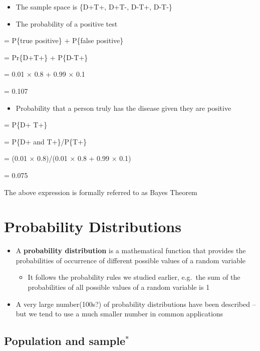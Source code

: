 \documentclass[
]{book}
\providecommand{\tightlist}{%
  \setlength{\itemsep}{0pt}\setlength{\parskip}{0pt}}
\begin{document}
\begin{itemize}
\tightlist
\item
  The sample space is \{D+T+, D+T-, D-T+, D-T-\}
\item
  The probability of a positive test
\end{itemize}

= P\{true positive\} + P\{false positive\}

= Pr\{D+T+\} + P\{D-T+\}

= 0.01 × 0.8 + 0.99 × 0.1

= 0.107

\begin{itemize}
\tightlist
\item
  Probability that a person truly has the disease given they are positive
\end{itemize}

= P\{D+ \textbar{} T+\}

= P\{D+ and T+\}/P\{T+\}

= (0.01 × 0.8)/(0.01 × 0.8 + 0.99 × 0.1)

= 0.075

The above expression is formally referred to as Bayes Theorem

\hypertarget{probability-distributions}{%
\section{Probability Distributions}\label{probability-distributions}}

\begin{itemize}
\tightlist
\item
  A \textbf{probability distribution} is a mathematical function that provides the probabilities of occurrence of different possible values of a random variable

  \begin{itemize}
  \tightlist
  \item
    It follows the probability rules we studied earlier, e.g.~the sum of the probabilities of all possible values of a random variable is 1
  \end{itemize}
\item
  A very large number(100s?) of probability distributions have been described -- but we tend to use a much smaller number in common applications
\end{itemize}

\hypertarget{population-and-sample}{%
\subsection{\texorpdfstring{Population and sample\(^*\)}{Population and sample\^{}*}}\label{population-and-sample}}
\end{document}
